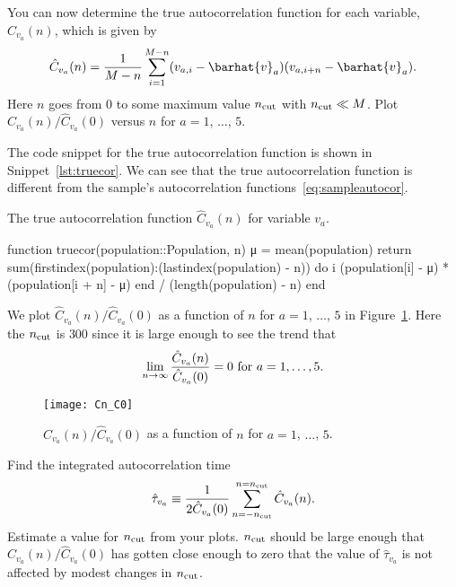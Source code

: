 \Question{} You can now determine the true autocorrelation function for each variable,
\(\hat{C}_{v_a}(n)\), which is given by
%
\begin{equation}
    \hat{C}_{v_a}(n) = \frac{ 1 }{ M - n }
    \sum_{i=1}^{M-n} (v_{a,i} - \barhat{v}_a) (v_{a,i + n} - \barhat{v}_a).
\end{equation}
%
Here \(n\) goes from \(0\) to some maximum value \(n_\textnormal{cut}\) with
\(n_\textnormal{cut} \ll M\).
Plot \(\hat{C}_{v_a}(n) / \hat{C}_{v_a}(0)\) versus \(n\) for \(a = 1\), \(\ldots\), \(5\).

\Answer{}
The code snippet for the true autocorrelation function is shown in Snippet~\ref{lst:truecor}.
We can see that the true autocorrelation function is different from the sample's
autocorrelation functions~\eqref{eq:sampleautocor}.

\begin{algorithm}
    \caption{The true autocorrelation function \(\hat{C}_{v_a}(n)\) for variable \(v_a\).}
    \label{lst:truecor}
    \begin{juliacode}
        function truecor(population::Population, n)
            μ = mean(population)
            return sum(firstindex(population):(lastindex(population) - n)) do i
                (population[i] - μ) * (population[i + n] - μ)
            end / (length(population) - n)
        end
    \end{juliacode}
\end{algorithm}

We plot \(\hat{C}_{v_a}(n) / \hat{C}_{v_a}(0)\) as a function of \(n\) for \(a = 1\), \(\ldots\),
\(5\) in Figure~\ref{fig:truecor}.
Here the \(n_\textnormal{cut}\) is \(300\) since it is large enough to see the trend
that
%
\begin{equation}
    \lim_{n \rightarrow \infty} \frac{ \hat{C}_{v_a}(n) }{ \hat{C}_{v_a}(0) } = 0
    \textnormal{  for } a = 1, \ldots, 5.
\end{equation}

\begin{figure}[h]
    \centering
    \texttt{[image: Cn\_C0]}
    \caption{\(\hat{C}_{v_a}(n) / \hat{C}_{v_a}(0)\) as a function of \(n\) for
        \(a = 1\), \(\ldots\), \(5\).}
    \label{fig:truecor}
\end{figure}

\Question{} Find the integrated autocorrelation time
%
\begin{equation}\label{eq:tau}
    \hat{\tau}_{v_a} \equiv \frac{ 1 }{ 2 \hat{C}_{v_a}(0) }
    \sum_{n=-n_\textnormal{cut}}^{n=n_\textnormal{cut}} \hat{C}_{v_a}(n).
\end{equation}
%
Estimate a value for \(n_\textnormal{cut}\) from your plots.
\(n_\textnormal{cut}\) should be large enough that \(\hat{C}_{v_a}(n) / \hat{C}_{v_a}(0)\)
has gotten close enough to zero that the value of \(\hat{\tau}_{v_a}\)
is not affected by modest changes in \(n_\textnormal{cut}\).


